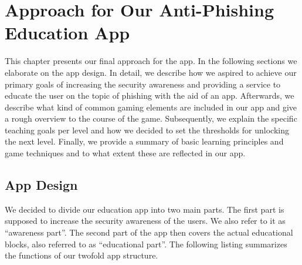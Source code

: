 
\section{Approach for Our Anti-Phishing Education App}
\label{s:approach}
This chapter presents our final approach for the app.
 In the following sections we elaborate on the app design.
In detail, we describe how we aspired to achieve our primary goals of increasing the security awareness and providing a service to educate the user on the topic of phishing with the aid of an app.
Afterwards, we describe what kind of common gaming elements are included in our app and give a rough overview to the course of the game.
Subsequently, we explain the specific teaching goals per level and how we decided to set the thresholds for unlocking the next level.
Finally, we provide a summary of basic learning principles and game techniques and to what extent these are reflected in our app.
\subsection{App Design}
\label{s:app_design}
We decided to divide our education app into two main parts.
 The first part is supposed to increase the security awareness of the users.
We also refer to it as ``awareness part''.
 The second part of the app then covers the actual educational blocks, also referred to as ``educational part''.
 The following listing summarizes the functions of our twofold app structure.

